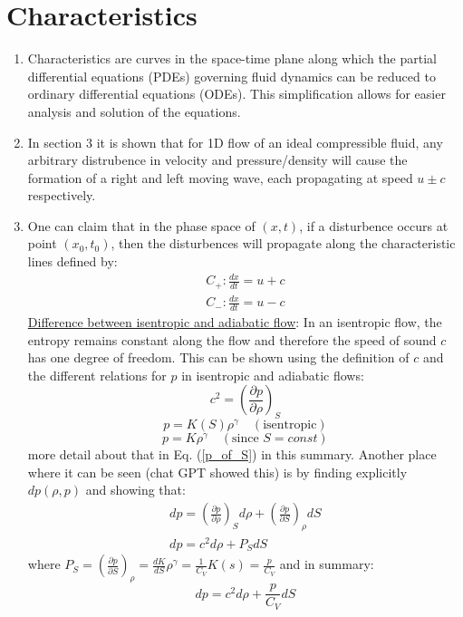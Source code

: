 ﻿\documentclass[11pt]{article}
\begin{document}
\section{Characteristics}
\begin{enumerate}
  \item Characteristics are curves in the space-time plane along which the partial differential equations (PDEs) governing fluid dynamics can be reduced to ordinary differential equations (ODEs). This simplification allows for easier analysis and solution of the equations.
  \item In section 3 it is shown that for 1D flow of an ideal compressible fluid, any arbitrary distrubence in velocity and pressure/density will cause the formation of a right and left moving wave, each propagating at speed $u \pm c$ respectively.
  \item One can claim that in the phase space of $(x,t)$, if a disturbence occurs at point $(x_0,t_0)$, then the disturbences will propagate along the characteristic lines defined by:
  \begin{align}
    C_+: \frac{dx}{dt} = u + c \label{char_plus} \\
    C_-: \frac{dx}{dt} = u - c \label{char_minus}
  \end{align}
  \underline{Difference between isentropic and adiabatic flow}: In an isentropic flow, the entropy remains constant along the flow and therefore the speed of sound $c$ has one degree of freedom. This can be shown using the definition of $c$ and the different relations for $p$ in isentropic and adiabatic flows:
  \begin{equation}
    c^2 = \left( \frac{\partial p}{\partial \rho} \right)_S
  \end{equation} 
  \begin{equation}
    p = K(S) \rho^\gamma \quad(\text{isentropic})
  \end{equation}
  \begin{equation}
    p = K \rho^\gamma \quad (\text{since } S=const)
  \end{equation}
  more detail about that in Eq. (\ref{p_of_S}) in this summary. Another place where it can be seen (chat GPT showed this) is by finding explicitly $dp(\rho, p)$ and showing that:
  \begin{align}
    dp = \left( \frac{\partial p}{\partial \rho} \right)_S d\rho + \left( \frac{\partial p}{\partial S} \right)_\rho dS \\
    dp = c^2 d\rho + P_S dS 
  \end{align}
  where $P_S = \left( \frac{\partial p}{\partial S} \right)_\rho = \frac{dK}{dS} \rho^\gamma = \frac{1}{C_V} K(s) = \frac{p}{C_V}$ and in summary:
  \begin{equation}
    dp = c^2 d\rho + \frac{p}{C_V} dS
  \end{equation}
  

\end{enumerate}
\end{document}

